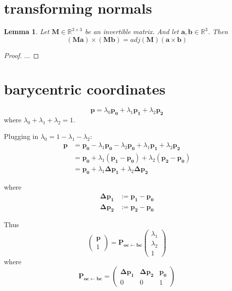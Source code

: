 \documentclass{article}
\newtheorem{lemma}{Lemma}
\newcommand{\R}{\mathbb{R}}
\newcommand{\vctr}[1]{\mathbf{#1}}
\newcommand{\point}[1]{\mathbf{#1}}
\newcommand{\mat}[1]{\mathbf{#1}}
\newcommand{\pMat}[2]{\mat{P_{#1 \leftarrow #2}}}
\newcommand{\colvec}[1]{\begin{pmatrix}#1\end{pmatrix}}
\begin{document}
\section{transforming normals}

\begin{lemma}
Let \(\mat{M} \in \R^{3\times 3}\) be an invertible matrix. And let \(\vctr{a}, \vctr{b} \in \R^3\). Then
\[
(\mat{M}\vctr{a})\times(\mat{M}\vctr{b}) = adj(\mat{M}) (\vctr{a} \times \vctr{b})
\]
\end{lemma}
\begin{proof}
 ...
\end{proof}



\section{barycentric coordinates}

\[
\point{p} = \lambda_0 \point{p_0} + \lambda_1 \point{p_1} + \lambda_2 \point{p_2}
\]
where \(\lambda_0 + \lambda_1 + \lambda_2 = 1\).

Plugging in \(\lambda_0 = 1 - \lambda_1 - \lambda_2\):
\begin{align*}
\point{p} &= \point{p_0} - \lambda_1 \point{p_0} - \lambda_2 \point{p_0}  + \lambda_1 \point{p_1} + \lambda_2 \point{p_2} \\
&= \point{p_0}  + \lambda_1 (\point{p_1}-\point{p_0}) + \lambda_2 (\point{p_2} - \point{p_0})\\
&= \point{p_0} + \lambda_1 \point{\Delta p_1} + \lambda_2 \point{\Delta p_2}
\end{align*}

where
\begin{align*}
\point{\Delta p_1} &:= \point{p_1} - \point{p_0}\\
\point{\Delta p_2} &:= \point{p_2} - \point{p_0}
\end{align*}

Thus
\[
 \colvec{\point{p}\\1} = \pMat{oc}{bc} \colvec{\lambda_1 \\ \lambda_2 \\ 1}
\]
where
\[
 \pMat{oc}{bc} = \begin{pmatrix} 
                  \point{\Delta p_1} & \point{\Delta p_2} & \point{p_0} \\
                  0 & 0 & 1
                 \end{pmatrix}
\]
\end{document}
